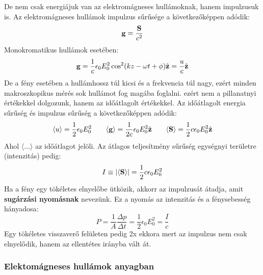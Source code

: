 \documentclass[../main.tex]{subfiles}
\begin{document}
De nem csak energiájuk van az elektromágneses hullámoknak, hanem impulzusuk is. Az elektromágneses hullámok impulzus sűrűsége a következőképpen adódik:
\begin{equation}
    \bold{g} = \frac{\bold{S}}{c^2}
\end{equation}
Monokromatikus hullámok esetében:
\begin{equation}
    \bold{g} = \frac{1}{c}\epsilon_0 E_0^2 \cos^2(kz - \omega t + \phi) \hat{\bold{z}} = \frac{u}{c} \hat{\bold{z}}
\end{equation}
De a fény esetében a hullámhossz túl kicsi és a frekvencia túl nagy, ezért minden makroszkopikus mérés sok hullámot fog magába foglalni. ezért nem a pillanatnyi értékekkel dolgozunk,
hanem az időátlagolt értékekkel. Az időátlagolt energia sűrűség és impulzus sűrűség a következőképpen adódik:
\begin{equation}
    \langle u \rangle = \frac{1}{2} \epsilon_0 E_0^2 \qquad \langle \bold{g} \rangle = \frac{1}{2c} \epsilon_0 E_0^2 \hat{\bold{z}} \qquad \langle \bold{S} \rangle = \frac{1}{2} c \epsilon_0 E_0^2 \hat{\bold{z}}
\end{equation}
Ahol $\langle ... \rangle$ az időátlagot jelöli. Az átlagos teljesítmény sűrűség egységnyi területre (intenzitás) pedig:
\begin{equation}
    I \equiv |\langle \bold{S} \rangle| = \frac{1}{2} c \epsilon_0 E_0^2
\end{equation}
Ha a fény egy tökéletes elnyelőbe ütközik, akkorr az impulzusát átadja, amit \textbf{sugárzási nyomásnak} nevezünk. Ez a nyomás az intenzitás és a fénysebesség hányadosa:
\begin{equation}
    P = \frac{1}{A} \frac{\Delta p}{\Delta t} = \frac{1}{2} \epsilon_0 E_0^2 =\frac{I}{c}
\end{equation}
Egy tökéletes visszaverő felületen pedig 2x ekkora mert az impulzus nem csak elnyelődik, hanem az ellentétes irányba vált át.

\subsubsection{Elektomágneses hullámok anyagban}
\end{document}

